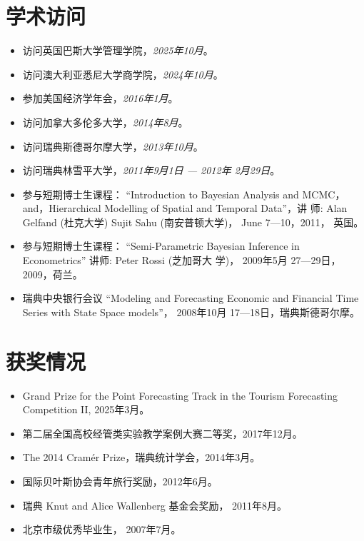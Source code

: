 \documentclass[twoside,a4paper,11pt]{article}
\begin{document}
\section{学术访问}

\begin{itemize}
\item 访问英国巴斯大学管理学院，\emph{2025年10月}。
\item 访问澳大利亚悉尼大学商学院，\emph{2024年10月}。
\item 参加美国经济学年会，\emph{2016年1月}。
\item 访问加拿大多伦多大学，\emph{2014年8月}。
\item 访问瑞典斯德哥尔摩大学，\emph{2013年10月}。

\item 访问瑞典林雪平大学，\emph{2011年9月1日 --- 2012年 2月29日}。

\item 参与短期博士生课程： ``Introduction to Bayesian Analysis and
  MCMC， and，Hierarchical Modelling of Spatial and Temporal Data''，讲
  师: Alan Gelfand (杜克大学) Sujit Sahu (南安普顿大学)， June
  7---10，2011， 英国。

\item 参与短期博士生课程： ``Semi-Parametric Bayesian Inference in
  Econometrics'' 讲师: Peter Rossi (芝加哥大
  学)， 2009年5月 27---29日，2009，荷兰。

\item 瑞典中央银行会议 ``Modeling and Forecasting Economic and
  Financial Time Series with State Space
  models''， 2008年10月 17---18日，瑞典斯德哥尔摩。
\end{itemize}

\section{获奖情况}
\begin{itemize}

\item Grand Prize for the Point Forecasting Track in the Tourism Forecasting Competition II, 2025年3月。
\item 第二届全国高校经管类实验教学案例大赛二等奖，2017年12月。
\item The 2014 Cramér Prize，瑞典统计学会，2014年3月。

\item 国际贝叶斯协会青年旅行奖励，2012年6月。

\item 瑞典 Knut and Alice Wallenberg 基金会奖励， 2011年8月。

\item 北京市级优秀毕业生， 2007年7月。
\end{itemize}
\end{document}
